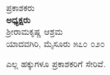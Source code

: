 \thispagestyle{empty}

\begin{flushleft}
ಪ್ರಕಾಶಕರು\\\textbf{ಅಧ್ಯಕ್ಷರು}\\ಶ‍್ರೀರಾಮಕೃಷ್ಣ ಆಶ್ರಮ\\ಯಾದವಗಿರಿ, ಮೈಸೂರು ೫೭೦ ೦೨೦
\end{flushleft}

\vfill

\begin{flushleft}
 ಎಲ್ಲ ಹಕ್ಕುಗಳೂ ಪ್ರಕಾಶಕರಿಗೆ ಸೇರಿವೆ.
\end{flushleft}

